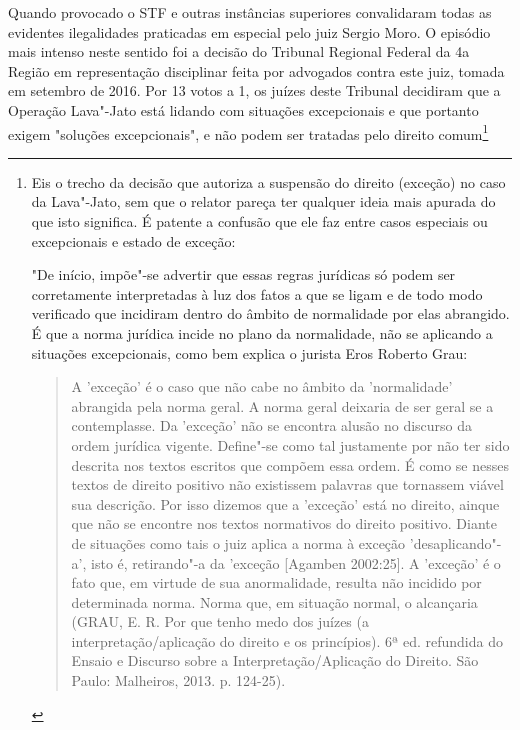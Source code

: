 Quando provocado o STF e outras instâncias superiores convalidaram todas
as evidentes ilegalidades praticadas em especial pelo juiz Sergio Moro.
O episódio mais intenso neste sentido foi a decisão do Tribunal Regional
Federal da 4a Região em representação disciplinar feita por advogados
contra este juiz, tomada em setembro de 2016. Por 13 votos a 1, os
juízes deste Tribunal decidiram que a Operação Lava"-Jato está lidando
com situações excepcionais e que portanto exigem "soluções
excepcionais", e não podem ser tratadas pelo direito comum\footnote{Eis
  o trecho da decisão que autoriza a suspensão do direito (exceção) no
  caso da Lava"-Jato, sem que o relator pareça ter qualquer ideia mais
  apurada do que isto significa. É patente a confusão que ele faz entre
  casos especiais ou excepcionais e estado de exceção:

  "De início, impõe"-se advertir que essas regras jurídicas só podem ser
  corretamente interpretadas à luz dos fatos a que se ligam e de todo
  modo verificado que incidiram dentro do âmbito de normalidade por elas
  abrangido. É que a norma jurídica incide no plano da normalidade, não
  se aplicando a situações excepcionais, como bem explica o jurista Eros
  Roberto Grau:

  \begin{quote}
  A 'exceção' é o caso que não cabe no âmbito da 'normalidade' abrangida
  pela norma geral. A norma geral deixaria de ser geral se a
  contemplasse. Da 'exceção' não se encontra alusão no discurso da ordem
  jurídica vigente. Define"-se como tal justamente por não ter sido
  descrita nos textos escritos que compõem essa ordem. É como se nesses
  textos de direito positivo não existissem palavras que tornassem
  viável sua descrição. Por isso dizemos que a 'exceção' está no
  direito, ainque que não se encontre nos textos normativos do direito
  positivo. Diante de situações como tais o juiz aplica a norma à
  exceção 'desaplicando"-a', isto é, retirando"-a da 'exceção {[}Agamben
  2002:25{]}. A 'exceção' é o fato que, em virtude de sua anormalidade,
  resulta não incidido por determinada norma. Norma que, em situação
  normal, o alcançaria (GRAU, E. R. Por que tenho medo dos juízes (a
  interpretação/aplicação do direito e os princípios). 6ª ed. refundida
  do Ensaio e Discurso sobre a Interpretação/Aplicação do Direito. São
  Paulo: Malheiros, 2013. p. 124-25).
  \end{quote}

}

